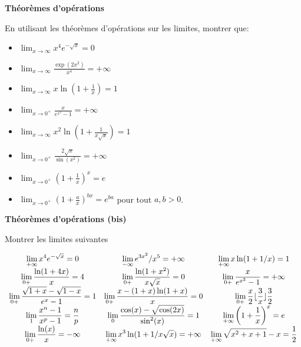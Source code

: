 \documentclass[a4paper,12pt]{article}
\newenvironment{disarray}%
 {\everymath{\displaystyle\everymath{}}\array}%
 {\endarray}
\begin{document}
\Exo \textbf{Théorèmes d'opérations}

En utilisant les théorèmes d'opérations sur les limites, montrer que:

\begin{itemize}
\item $\displaystyle \lim_{x \to \infty} x^4e^{-\sqrt{x}} = 0$
\item $\displaystyle \lim_{x \to \infty} \frac{\exp(2x^2)}{x^4} = +\infty$
\item $\displaystyle \lim_{x \to \infty} x\ln\left(1 + \frac{1}{x}\right) = 1$
\item $\displaystyle \lim_{x \to 0^+} \frac{x}{e^{x^2} - 1} = +\infty$
\item $\displaystyle \lim_{x \to \infty}  x^2\ln\left(1 + \frac{1}{x\sqrt{x}}\right) = 1 $
\item $\displaystyle \lim_{x \to 0^+} \frac{2\sqrt{x}}{\sin(x^2)} = +\infty$
\item $\displaystyle \lim_{x \to 0^+} \left( 1 + \frac{1}{x}\right)^x = e$
\item $\displaystyle \lim_{x \to 0^+} \left( 1 + \frac{a}{x}\right)^{bx} = e^{ba}$ pour tout $a,b > 0$.
\end{itemize}

\Exo \textbf{Théorèmes d'opérations (bis)}

Montrer les limites suivantes

\begin{equation*}
  \begin{disarray}{ccc}
    \lim_{+\infty} x^4 e^{-\sqrt{x}} = 0 & \lim_{-\infty} e^{3x^2}/x^5 = +\infty & \lim_{+\infty} x\ln(1 + 1/x) = 1\\
    \lim_{0+} \frac{\ln(1+4x)}{x} = 4 & \lim_{0+} \frac{\ln(1+x^2)}{x\sqrt{x}} = 0 & \lim_{0+} \frac{x}{e^{x^2} - 1} = +\infty \\
    \lim_{0+} \frac{\sqrt{1+x} - \sqrt{1-x}}{e^{x} - 1} = 1 & \lim_{0+} \frac{x - (1+x)\ln(1+x)}{x} = 0 & \lim_{0+} \frac{x}{2} \lfloor \frac{3}{x} \rfloor \frac{3}{2} \\
    \lim_{1} \frac{x^n - 1}{x^p - 1} = \frac{n}{p} & \lim_{0} \frac{\cos(x) - \sqrt{\cos(2x)}}{\sin^2(x)} = 1 & \lim_{+\infty} \left(1 + \frac{1}{x}\right)^x = e \\
    \lim_{0+} \frac{\ln(x)}{x} = -\infty & \lim_{+\infty} x^3\ln(1+ 1/x\sqrt{x}) = +\infty & \lim_{+\infty} \sqrt{x^2 + x + 1} - x = \frac{1}{2} \\
  \end{disarray}
\end{equation*}
\end{document}
